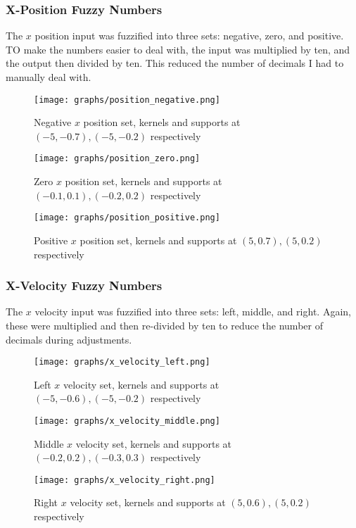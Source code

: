 \documentclass[12pt, article]{scrartcl}
\begin{document}
\subsubsection{X-Position Fuzzy Numbers}
The $x$ position input was fuzzified into three sets: negative, zero, and positive. TO make the numbers easier to deal with, the input was multiplied by ten, and the output then divided by ten. This reduced the number of decimals I had to manually deal with.
\begin{figure}[h]
    \centering
    \caption{Negative $x$ position set, kernels and supports at $(-5, -0.7), (-5, -0.2)$ respectively}
    \texttt{[image: graphs/position\_negative.png]}
\end{figure}
\begin{figure}[h]
    \centering
    \caption{Zero $x$ position set, kernels and supports at $(-0.1, 0.1), (-0.2, 0.2)$ respectively}
    \texttt{[image: graphs/position\_zero.png]}
\end{figure}
\begin{figure}[h]
    \centering
    \caption{Positive $x$ position set, kernels and supports at $(5, 0.7), (5, 0.2)$ respectively}
    \texttt{[image: graphs/position\_positive.png]}
\end{figure}

\subsubsection{X-Velocity Fuzzy Numbers}
The $x$ velocity input was fuzzified into three sets: left, middle, and right. Again, these were multiplied and then re-divided by ten to reduce the number of decimals during adjustments.
\begin{figure}[h]
    \centering
    \caption{Left $x$ velocity set, kernels and supports at $(-5, -0.6), (-5, -0.2)$ respectively}
    \texttt{[image: graphs/x\_velocity\_left.png]}
\end{figure}
\begin{figure}[h]
    \centering
    \caption{Middle $x$ velocity set, kernels and supports at $(-0.2, 0.2), (-0.3, 0.3)$ respectively}
    \texttt{[image: graphs/x\_velocity\_middle.png]}
\end{figure}
\begin{figure}[h]
    \centering
    \caption{Right $x$ velocity set, kernels and supports at $(5, 0.6), (5, 0.2)$ respectively}
    \texttt{[image: graphs/x\_velocity\_right.png]}
\end{figure}
\end{document}
